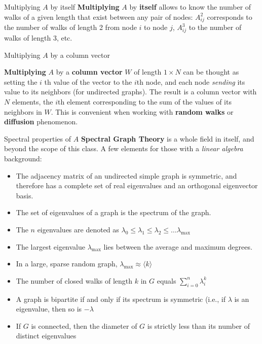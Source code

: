 \begin{textbox}{Multiplying $A$ by itself}
  \textbf{Multiplying} $A$ by \textbf{itself} allows to know the number of walks of a given length that exist between any pair of nodes: $A^2_{ij}$ corresponds to the number of walks of length 2 from node $i$ to node $j$, $A^3_{ij}$ to the number of walks of length 3, etc.
\end{textbox}

\begin{textbox}{Multiplying $A$ by a column vector}

  \textbf{Multiplying} $A$ by a \textbf{column vector} $W$ of length $1\times N$ can be thought as setting the $i$ th value of the vector to the $i$th node, and each node \textit{sending} its value to its neighbors (for undirected graphs). The result is a column vector with $N$ elements, the $i$th element corresponding to the sum of the values of its neighbors in $W$. This is convenient when working with \textbf{random walks} or \textbf{diffusion} phenomenon.
\end{textbox}


\begin{textbox}{Spectral properties of $A$}
  \textbf{Spectral Graph Theory} is a whole field in itself, and beyond the scope of this class. A few elements for those with a \textit{linear algebra} background:

  \begin{itemize}
    \item The adjacency matrix of an undirected simple graph is symmetric, and therefore has a complete set of real eigenvalues and an orthogonal eigenvector basis.
    \item The set of eigenvalues of a graph is the spectrum of the graph.
    \item The $n$ eigenvalues are denoted as $\lambda_0 \leq \lambda_1 \leq \lambda_2 \leq \dots \lambda_{\max}$
    \item The largest eigenvalue $\lambda_{\max}$ lies between the average and maximum degrees.
    \item In a large, sparse random graph, $\lambda_{\max}\approx \langle k \rangle$
    \item The number of closed walks of length $k$ in $G$ equals $\sum^n_{i=0} \lambda^k_i$
    \item A graph is bipartite if and only if its spectrum is symmetric (i.e., if $\lambda$ is an eigenvalue, then so is $-\lambda$
    \item If $G$ is connected, then the diameter of $G$ is strictly less than its number of distinct eigenvalues
  \end{itemize}
\end{textbox}



